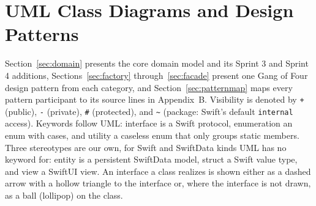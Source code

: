 \documentclass[12pt,letterpaper]{article}
\newcommand{\st}[1]{\guillemotleft#1\guillemotright}   %
\begin{document}
\section{UML Class Diagrams and Design Patterns}
Section~\ref{sec:domain} presents the core domain model and its Sprint 3 and Sprint 4
additions,
Sections~\ref{sec:factory} through~\ref{sec:facade} present one Gang of Four design
pattern from each category, and Section~\ref{sec:patternmap} maps every pattern
participant to its source lines in Appendix~B. Visibility is denoted by \texttt{+} (public), \texttt{-}
(private), \texttt{\#} (protected), and \texttt{\textasciitilde} (package: Swift's default
\texttt{internal} access). Keywords follow UML: \st{interface} is a Swift protocol,
\st{enumeration} an enum with cases, and \st{utility} a caseless enum that only groups
static members. Three stereotypes are our own, for Swift and SwiftData kinds UML has no
keyword for: \st{entity} is a persistent SwiftData model, \st{struct} a Swift value type,
and \st{view} a SwiftUI view. An interface a class realizes is shown either as a dashed
arrow with a hollow triangle to the interface or, where the interface is not drawn, as a
ball (lollipop) on the class.
\end{document}
